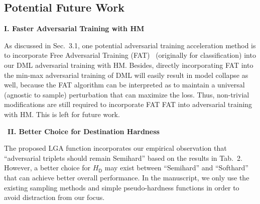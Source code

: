 
\subsection{Potential Future Work}

\noindent\textbf{I. Faster Adversarial Training with HM}

As discussed in Sec.~3.1, one potential adversarial training acceleration
method is to incorporate Free Adversarial Training (FAT)~\cite{freeat}
(originally for classification) into our DML adversarial training with HM.
%
Besides, directly incorporating FAT into the min-max adversarial training of
DML will easily result in model collapse as well, because the FAT algorithm can
be interpreted as to maintain a universal (agnostic to sample) perturbation
that can maximize the loss.
%
Thus, non-trivial modifications are still required to incorporate FAT FAT into
adversarial training with HM. This is left for future work.

\begin{comment}
FAT works on toy dataset only for adversarial DML.

Further experiments suggest very weak robustness and the
models are very prone to collapse due to the non-zero initial delta
(results in too hard adversarial example).

Gradient approximation does not work. Triplet gradient and ACT
gradient are convertible.

Does the new generic HM work under FAT?
	Previous FAT leads to collapse because (even if in the amdsemi +fat
	experiment due to implementation issue) the delta is going to be universal
	so that for every input $x$ it will increase $H[L(x)]$ as much as possible.
	This is too prone to lead to collpase. Can we reuse the gradient for 
	Hardness Manipulation then? We linearly scale down the delta?
	We want to minimize $E[|H_{src}(x)-H_{dst}(x)|]$ (to a specified hardness).
\end{comment}

~\newline\textbf{II. Better Choice for Destination Hardness}

The proposed LGA function incorporates our empirical observation that
``adversarial triplets should remain Semihard'' based on the results in Tab.~2.
%
However, a better choice for $H_\mathsf{D}$ may exist between ``Semihard'' and
``Softhard'' that can achieve better overall performance.
%
In the manuscript, we only use the existing sampling methods and simple
pseudo-hardness functions in order to avoid distraction from our focus.

